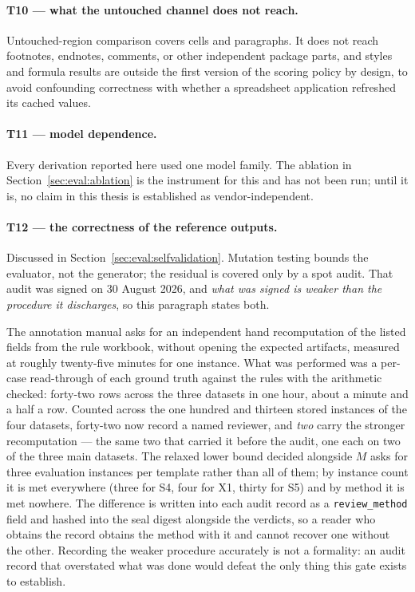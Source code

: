 \paragraph{T10 --- what the untouched channel does not reach.}
Untouched-region comparison covers cells and paragraphs. It does not reach footnotes,
endnotes, comments, or other independent package parts, and styles and formula results are
outside the first version of the scoring policy by design, to avoid confounding correctness
with whether a spreadsheet application refreshed its cached values.

\paragraph{T11 --- model dependence.}
Every derivation reported here used one model family. The ablation in
Section~\ref{sec:eval:ablation} is the instrument for this and has not been run; until it is,
no claim in this thesis is established as vendor-independent.

\paragraph{T12 --- the correctness of the reference outputs.}
Discussed in Section~\ref{sec:eval:selfvalidation}. Mutation testing bounds the evaluator,
not the generator; the residual is covered only by a spot audit. That audit was signed on
30 August 2026, and \emph{what was signed is weaker than the procedure it discharges}, so
this paragraph states both.

The annotation manual asks for an independent hand recomputation of the listed fields from
the rule workbook, without opening the expected artifacts, measured at roughly twenty-five
minutes for one instance. What was performed was a per-case read-through of each ground
truth against the rules with the arithmetic checked: forty-two rows across the three
datasets in one hour, about a minute and a half a row. Counted across the one hundred and
thirteen stored instances of the four datasets, forty-two now record a named reviewer, and
\emph{two} carry the stronger recomputation --- the same two that carried it before the
audit, one each on two of the three main datasets. The relaxed lower bound decided alongside
$M$ asks for three evaluation instances per template rather than all of them; by instance
count it is met everywhere (three for S4, four for X1, thirty for S5) and by method it is met
nowhere. The difference is written into each audit record as a \texttt{review\_method} field
and hashed into the seal digest alongside the verdicts, so a reader who obtains the record
obtains the method with it and cannot recover one without the other. Recording the weaker
procedure accurately is not a formality: an audit record that overstated what was done would
defeat the only thing this gate exists to establish.

